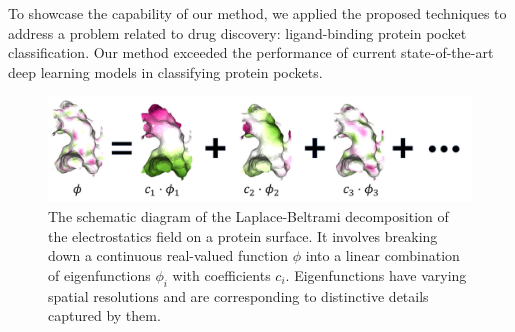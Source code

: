 To showcase the capability of our method, we applied the proposed techniques to address a problem related to drug discovery: ligand-binding protein pocket classification.
Our method exceeded the performance of current state-of-the-art deep learning models in classifying protein pockets.

\begin{figure}[ht]
    \centering
    \includegraphics[width=0.7\linewidth]{figures/Laplace-Beltrami.pdf}
    \caption{
        The schematic diagram of the Laplace-Beltrami decomposition of the electrostatics field on a protein surface. It involves breaking down a continuous real-valued function $\phi$ into a linear combination of eigenfunctions $\phi_i$ with coefficients $c_i$. Eigenfunctions have varying spatial resolutions and are corresponding to distinctive details captured by them.
    }
    \label{fig:Laplace-Beltrami}
\end{figure}
